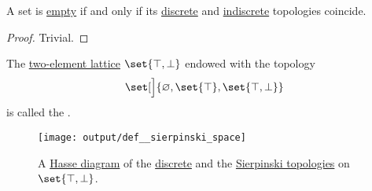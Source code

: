 \begin{proposition}\label{thm:empty_set_discrete_and_indiscrete_topologies}
  A set is \hyperref[def:empty_set]{empty} if and only if its \hyperref[def:discrete_topology]{discrete} and \hyperref[def:indiscrete_topology]{indiscrete} topologies coincide.
\end{proposition}
\begin{proof}
  Trivial.
\end{proof}

\begin{definition}\label{def:sierpinski_space}
  The \hyperref[thm:two_element_lattice]{two-element lattice} \( \set{ \top, \bot } \) endowed with the topology
  \begin{equation*}
    \set[\Big]{ \varnothing, \set{ \top }, \set{ \top, \bot } }
  \end{equation*}
  is called the .

  \begin{figure}[!ht]
    \hfill
    \texttt{[image: output/def\_\_sierpinski\_space]}
    \hfill\hfill
    \caption{A \hyperref[def:hasse_diagram]{Hasse diagram} of the \hyperref[def:discrete_topology]{discrete} and the \hyperref[def:sierpinski_space]{Sierpinski topologies} on \( \set{ \top, \bot } \). }
    \label{fig:def:sierpinski_space}
  \end{figure}
\end{definition}

